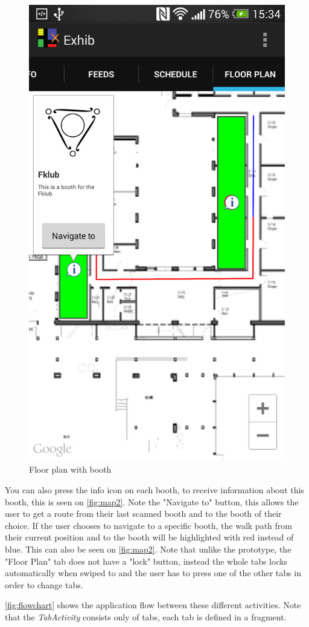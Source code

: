 \begin{figure}[H]
\centering
\includegraphics[width=0.35\columnwidth]{img/finaldesign/map2.png}
\caption{Floor plan with booth}
\label{fig:map2}
\end{figure}

You can also press the info icon on each booth, to receive information about this booth, this is seen on \autoref{fig:map2}. Note the "Navigate to" button, this allows the user to get a route from their last scanned booth and to the booth of their choice. If the user chooses to navigate to a specific booth, the walk path from their current position and to the booth will be highlighted with red instead of blue. This can also be seen on \autoref{fig:map2}. Note that unlike the prototype, the "Floor Plan" tab does not have a "lock" button, instead the whole tabs locks automatically when swiped to and the user has to press one of the other tabs in order to change tabs.

\autoref{fig:flowchart} shows the application flow between these different activities. Note that the \textit{TabActivity} consists only of tabs, each tab is defined in a fragment.

